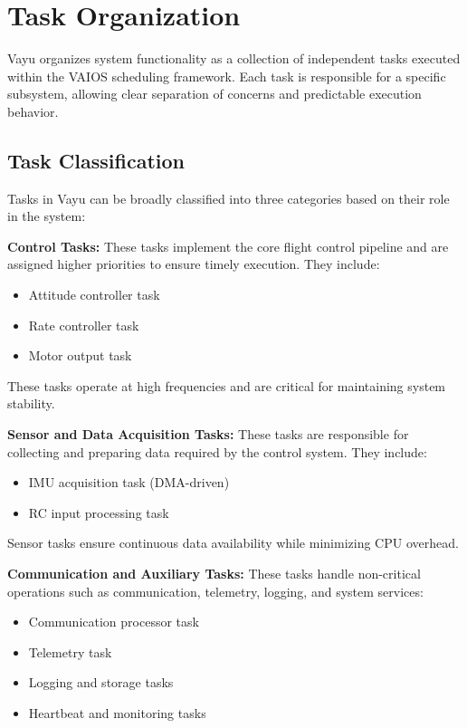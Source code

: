 \section{Task Organization}
\label{sec:vayu_tasks}

Vayu organizes system functionality as a collection of independent tasks executed within the VAIOS scheduling framework. Each task is responsible for a specific subsystem, allowing clear separation of concerns and predictable execution behavior.

\subsection{Task Classification}

Tasks in Vayu can be broadly classified into three categories based on their role in the system:

\textbf{Control Tasks:}  
These tasks implement the core flight control pipeline and are assigned higher priorities to ensure timely execution. They include:
\begin{itemize}
    \item Attitude controller task
    \item Rate controller task
    \item Motor output task
\end{itemize}

These tasks operate at high frequencies and are critical for maintaining system stability.

\textbf{Sensor and Data Acquisition Tasks:}  
These tasks are responsible for collecting and preparing data required by the control system. They include:
\begin{itemize}
    \item IMU acquisition task (DMA-driven)
    \item RC input processing task
\end{itemize}

Sensor tasks ensure continuous data availability while minimizing CPU overhead.

\textbf{Communication and Auxiliary Tasks:}  
These tasks handle non-critical operations such as communication, telemetry, logging, and system services:
\begin{itemize}
    \item Communication processor task
    \item Telemetry task
    \item Logging and storage tasks
    \item Heartbeat and monitoring tasks
\end{itemize}

